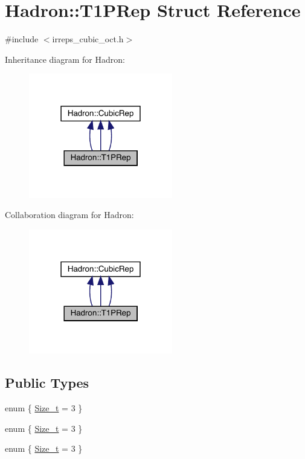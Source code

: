 \hypertarget{structHadron_1_1T1PRep}{}\section{Hadron\+:\+:T1\+P\+Rep Struct Reference}
\label{structHadron_1_1T1PRep}


{\ttfamily \#include $<$irreps\+\_\+cubic\+\_\+oct.\+h$>$}



Inheritance diagram for Hadron\+:
\nopagebreak
\begin{figure}[H]
\begin{center}
\leavevmode
\includegraphics[width=178pt]{db/daf/structHadron_1_1T1PRep__inherit__graph}
\end{center}
\end{figure}


Collaboration diagram for Hadron\+:
\nopagebreak
\begin{figure}[H]
\begin{center}
\leavevmode
\includegraphics[width=178pt]{dc/d2c/structHadron_1_1T1PRep__coll__graph}
\end{center}
\end{figure}
\subsection*{Public Types}
\begin{DoxyCompactItemize}
\item 
enum \{ \mbox{\hyperlink{structHadron_1_1T1PRep_a908d6a9ed5e5fd551103756ab8cba93da6a22073dff755f03a0da1a8ad313b559}{Size\+\_\+t}} = 3
 \}
\item 
enum \{ \mbox{\hyperlink{structHadron_1_1T1PRep_a908d6a9ed5e5fd551103756ab8cba93da6a22073dff755f03a0da1a8ad313b559}{Size\+\_\+t}} = 3
 \}
\item 
enum \{ \mbox{\hyperlink{structHadron_1_1T1PRep_a908d6a9ed5e5fd551103756ab8cba93da6a22073dff755f03a0da1a8ad313b559}{Size\+\_\+t}} = 3
 \}
\end{DoxyCompactItemize}
